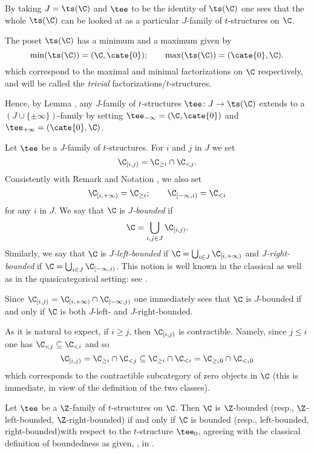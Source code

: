 \begin{example}
By taking $J=\ts(\C)$ and $\tee$ to be the identity of $\ts(\C)$ one sees that the whole $\ts(\C)$ can be looked at as a particular $J$-family of $t$-structures on $\C$.
\end{example}
\begin{remark}\label{infinity}
The poset $\ts(\C)$ has a minimum and a maximum given by
\[
\min(\ts(\C))=(\C,\cate{0});\qquad \max(\ts(\C))=(\cate{0},\C).
\]
which correspond to the maximal and minimal factorizations on $\C$ respectively, and will be called the \emph{trivial} factorizations\fshyp{}$t$-structures. 

Hence, by Lemma , any $J$-family of $t$-structures $\tee\colon J\to \ts(\C)$ extends to a $(J\cup\{\pm\infty\})$-family by setting $\tee_{-\infty}=(\C,\cate{0})$ and $\tee_{+\infty}=(\cate{0},\C)$. 
\end{remark}
\begin{definition}\label{std.endocardium}
Let $\tee$ be a $J$-family of $t$-structures. For $i$ and $j$ in $J$ we set
\[
\C_{[i,j)}=\C_{\geq i}\cap \C_{<j}.
\]
Consistently with Remark  and Notation , we also set
\[
\C_{[i,+\infty)}=\C_{\geq i};\qquad \C_{[-\infty,i)}= \C_{<i}
\]
for any $i$ in $J$. We say that $\C$ is \emph{$J$-bounded} if 
\[
\C=\bigcup_{i,j\in J}\C_{[i,j)}.
\]
Similarly, we say that $\C$ is \emph{$J$-left-bounded} if $\C=\bigcup_{i\in J}\C_{[i,+\infty)}$ and \emph{$J$-right-bounded} if $\C=\bigcup_{i\in J}\C_{[-\infty,i)}$. This notion is well known in the classical as well as in the quasicategorical setting: see \cite{BBDPervers,LurieHA}.
\end{definition}
\begin{remark}
Since $\C_{[i,j)}=\C_{[i,+\infty)}\cap \C_{[-\infty,j)}$ one immediately sees that $\C$ is $J$-bounded if and only if $\C$ is both $J$-left- and $J$-right-bounded.
\end{remark}
\begin{remark}
As it is natural to expect, if $i\geq j$, then $\C_{[i,j)}$ is contractible. Namely, since $j\leq i$ one has $\C_{<j}\subseteq \C_{<i}$ and so 
\[
\C_{[i,j)}=\C_{\geq i}\cap \C_{<j}\subseteq \C_{\geq i}\cap \C_{<i}=\C_{\geq_i0}\cap \C_{<_i0}
\]
which corresponds to the contractible subcategory of zero objects in $\C$ (this is immediate, in view of the definition of the two classes).
\end{remark}
\begin{remark}
Let $\tee$ be a $\Z $-family of $t$-structures on $\C$. Then $\C$ is $\Z $-bounded (resp., $\Z $-left-bounded, $\Z $-right-bounded) if and only if $\C$ is bounded (resp., left-bounded, right-bounded)with respect to the $t$-structure $\tee_0$, agreeing with the classical definition of boundedness as given, \eg, in \cite{BBDPervers}.
\end{remark}
